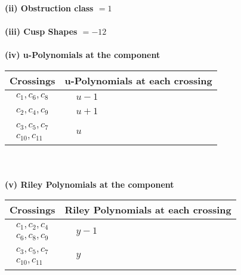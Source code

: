 \documentclass[1p]{elsarticle_modified}
\theoremstyle{definition}
\begin{document}
\flushleft \textbf{(ii) Obstruction class $= 1$}\\~\\
\flushleft \textbf{(iii) Cusp Shapes $= -12$}\\~\\
\newpage\renewcommand{\arraystretch}{1}
\flushleft \textbf{(iv) u-Polynomials at the component}\newline \\
\begin{tabular}{m{50pt}|m{274pt}}
Crossings & \hspace{64pt}u-Polynomials at each crossing \\
\hline $$\begin{aligned}c_{1},c_{6},c_{8}\end{aligned}$$&$\begin{aligned}
&u-1
\end{aligned}$\\
\hline $$\begin{aligned}c_{2},c_{4},c_{9}\end{aligned}$$&$\begin{aligned}
&u+1
\end{aligned}$\\
\hline $$\begin{aligned}c_{3},c_{5},c_{7}\\c_{10},c_{11}\end{aligned}$$&$\begin{aligned}
&u
\end{aligned}$\\
\hline
\end{tabular}\\~\\
\newpage\renewcommand{\arraystretch}{1}
\flushleft \textbf{(v) Riley Polynomials at the component}\newline \\
\begin{tabular}{m{50pt}|m{274pt}}
Crossings & \hspace{64pt}Riley Polynomials at each crossing \\
\hline $$\begin{aligned}c_{1},c_{2},c_{4}\\c_{6},c_{8},c_{9}\end{aligned}$$&$\begin{aligned}
&y-1
\end{aligned}$\\
\hline $$\begin{aligned}c_{3},c_{5},c_{7}\\c_{10},c_{11}\end{aligned}$$&$\begin{aligned}
&y
\end{aligned}$\\
\hline
\end{tabular}\\~\\
\end{document}
